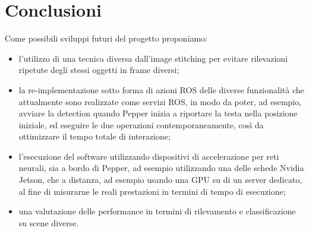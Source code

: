 \section{Conclusioni}

Come possibili sviluppi futuri del progetto proponiamo:
\begin{itemize}
    \item l'utilizzo di una tecnica diversa dall'image stitching per evitare rilevazioni ripetute degli stessi oggetti in frame diversi;
    \item la re-implementazione sotto forma di azioni ROS delle diverse funzionalità che attualmente sono realizzate come servizi ROS, in modo da poter, ad esempio, avviare la detection quando Pepper inizia a riportare la testa nella posizione iniziale, ed eseguire le due operazioni contemporaneamente, così da ottimizzare il tempo totale di interazione;
    \item l'esecuzione del software utilizzando dispositivi di accelerazione per reti neurali, sia a bordo di Pepper, ad esempio utilizzando una delle schede Nvidia Jetson, che a distanza, ad esempio usando una GPU su di un server dedicato, al fine di misurarne le reali prestazioni in termini di tempo di esecuzione;
    \item una valutazione delle performance in termini di rilevamento e classificazione su scene diverse.
\end{itemize} 